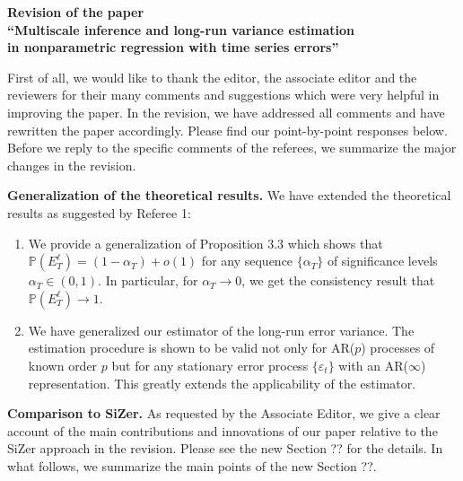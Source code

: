 \documentclass[a4paper,12pt]{article}
\begin{document}
\begin{center} 
{\large \bf Revision of the paper} \\[0.1cm]
{\large \bf ``Multiscale inference and long-run variance estimation} \\[0.1cm]
{\large \bf in nonparametric regression with time series errors''} 
\end{center}
\vspace{7pt}



First of all, we would like to thank the editor, the associate editor and the reviewers for their many comments and suggestions which were very helpful in improving the paper. In the revision, we have addressed all comments and have rewritten the paper accordingly. Please find our point-by-point responses below. 
Before we reply to the specific comments of the referees, we summarize the major changes in the revision.
\vspace{10pt}


\textbf{Generalization of the theoretical results.} We have extended the theoretical results as suggested by Referee 1:
\begin{enumerate}[label=(\roman*), leftmargin=0.8cm]

\item We provide a generalization of Proposition 3.3 which shows that $\mathbb{P}({E}_T^{\ell}) = (1 - \alpha_T) + o(1)$ for any sequence $\{\alpha_T\}$ of significance levels $\alpha_T \in (0,1)$. In particular, for $\alpha_T \rightarrow 0$, we get the consistency result that $\mathbb{P}({E}_T^{\ell}) \rightarrow 1$. 

\item We have generalized our estimator of the long-run error variance. The estimation procedure is shown to be valid not only for AR($p$) processes of known order $p$ but for any stationary error process $\{\varepsilon_t\}$ with an AR($\infty$) representation. This greatly extends the applicability of the estimator. 
\end{enumerate}
\vspace{3pt}


\textbf{Comparison to SiZer.} As requested by the Associate Editor, we give a clear account of the main contributions and innovations of our paper relative to the SiZer approach in the revision. Please see the new Section ?? for the details. In what follows, we summarize the main points of the new Section ??. 
\end{document}
